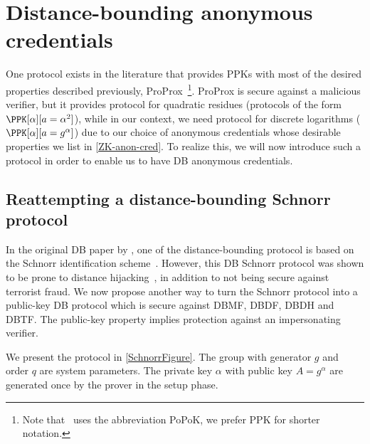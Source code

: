 \section{Distance-bounding anonymous credentials}%
\label{DB-anon-cred}

One protocol exists in the literature that provides \acp{PPK} with most of the 
desired properties described previously, ProProx~\cite{ProProx}\footnote{Note 
  that~\cite{ProProx} uses the abbreviation PoPoK, we prefer \acs{PPK} for 
  shorter notation.}.
ProProx is secure against a malicious verifier, but it provides  
protocol for quadratic residues (\ie protocols of the form \(\PPK[\alpha][a = 
  \alpha^2]\)), while in our context, we need  protocol for discrete 
logarithms (\ie \(\PPK[\alpha][a = g^\alpha]\)) due to our choice of 
anonymous credentials whose desirable properties we list in
\cref{ZK-anon-cred}.%
To realize this, we will now introduce such a protocol in order to enable us to have \ac{DB} anonymous credentials.

\subsection{Reattempting a distance-bounding Schnorr protocol}%
\label{DBSchnorr}

In the original \ac{DB} paper by \citet{DistanceBounding}, one of the distance-bounding protocol is based on the Schnorr identification scheme~\cite{Schnorr}.
However, this \ac{DB} Schnorr protocol was shown to be prone to distance hijacking~\cite{DistanceHijacking, TamarinDB}, in addition to not being secure against terrorist fraud.
We now propose another way to turn the Schnorr protocol into a
public-key \ac{DB} protocol which is secure against \ac{DBMF},
\ac{DBDF}, \ac{DBDH} and \ac{DBTF}.
The public-key property implies protection against an impersonating
verifier.

We present the protocol in \cref{SchnorrFigure}.
The group with generator \(g\) and order \(q\) are system parameters.
The private key \(\alpha\) with public key \(A = g^\alpha\) are generated once 
by the prover in the setup phase.

